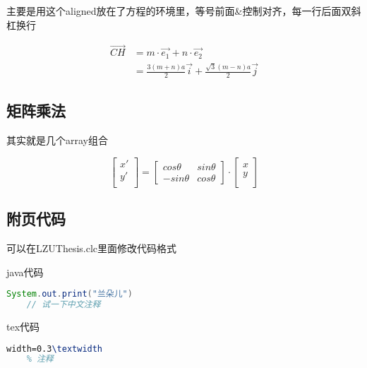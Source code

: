 \documentclass[AutoFakeBold]{LZUThesis}
\begin{document}
主要是用这个aligned放在了方程的环境里，等号前面\&控制对齐，每一行后面双斜杠换行

\begin{equation}
    \begin{aligned}
        \vec{CH} & = m\cdot \vec{e_1} + n\cdot \vec{e_2} \\
        & = \frac{3(m+n)a}{2} \vec{i} + \frac{\sqrt{3}(m-n)a}{2} \vec{j} 
    \end{aligned}
    \label{ch}
\end{equation}


\subsection{矩阵乘法} %
\label{sub:矩阵乘法}

其实就是几个array组合

\begin{equation}
    \left[ 
    \begin{array}{c}
    x'\\
    y'\\
    \end{array}
    \right]=
    \left[ 
    \begin{array}{cc}
    cos \theta & sin \theta \\
    - sin \theta & cos \theta 
    \end{array}
    \right]
    \cdot
    \left[ 
    \begin{array}{c}
        x\\
        y\\
    \end{array}
    \right]
\end{equation}



\subsection{附页代码} %
\label{sub:附页代码}
可以在LZUThesis.clc里面修改代码格式

java代码
\begin{lstlisting}[language = java]
    System.out.print("兰朵儿")
    // 试一下中文注释
\end{lstlisting}


tex代码
\begin{lstlisting}[language = tex]
    width=0.3\textwidth
    % 注释
\end{lstlisting}
\end{document}
